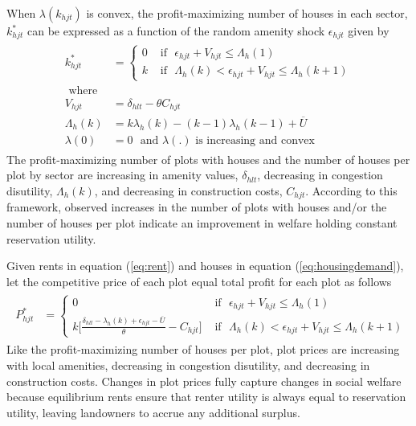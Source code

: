 \documentclass[12pt]{article}
\begin{document}
When $\lambda(k_{hjt})$ is convex, the profit-maximizing number of houses in each sector, $k^{*}_{hjt}$ can be expressed as a function of the random amenity shock $\epsilon_{hjt}$ given by
\begin{align}
\label{eq:housingdemand}
\begin{split}
k_{hjt}^{*} &=
\begin{cases}
0 &\text{ if }\,\, \epsilon_{hjt} + V_{hjt} \leq \Lambda_{h}(1)  \\
k &\text{ if }\,\,  \Lambda_{h}(k) < \epsilon_{hjt} + V_{hjt} \leq \Lambda_{h}(k+1)
\end{cases} \\
\text{ where }& \\
V_{hjt} & = \delta_{hlt}  - \theta C_{hjt}   \\
\Lambda_{h}(k) & =  k\lambda_{h}(k) - (k-1)\lambda_{h}(k-1) + \overline{U} \\
\lambda(0) & = 0 \,\, \text{ and } \lambda(.) \text{ is increasing and convex }
\end{split}
\end{align}
The profit-maximizing number of plots with houses and the number of houses per plot by sector are increasing in amenity values, $\delta_{hlt}$, decreasing in congestion disutility, $\Lambda_{h}(k)$, and decreasing in construction costs, $C_{hjt}$.  According to this framework, observed increases in the number of plots with houses and/or the number of houses per plot indicate an improvement in welfare holding constant reservation utility.  

Given rents in equation (\ref{eq:rent}) and houses in equation (\ref{eq:housingdemand}), let the competitive price of each plot equal total profit for each plot as follows
\begin{align}
\label{eq:profits}
\begin{split}
P_{hjt}^{*}  &=
\begin{cases}
0 &\text{ if }\,\, \epsilon_{hjt} + V_{hjt} \leq \Lambda_{h}(1)  \\
k \Big[ \frac{ \delta_{hlt} - \lambda_{h}(k) + \epsilon_{hjt} - \overline{U}}{\theta}  - C_{hjt}\Big] &\text{ if }\,\,  \Lambda_{h}(k) < \epsilon_{hjt} + V_{hjt} \leq \Lambda_{h}(k+1)
\end{cases} 
\end{split}
\end{align}
Like the profit-maximizing number of houses per plot, plot prices are increasing with local amenities, decreasing in congestion disutility, and decreasing in construction costs.  Changes in plot prices fully capture changes in social welfare because equilibrium rents ensure that renter utility is always equal to reservation utility, leaving landowners to accrue any additional surplus. 
\end{document}
